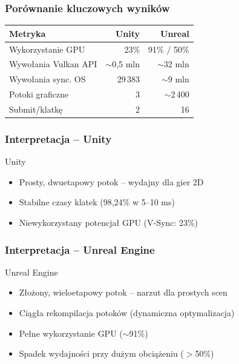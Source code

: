 \documentclass{beamer}
\begin{document}
\begin{frame}
  \frametitle{Porównanie kluczowych wyników}
  \begin{table}
    \centering
    \small
    \begin{tabular}{lrr}
      \toprule
      \textbf{Metryka} & \textbf{Unity} & \textbf{Unreal} \\
      \midrule
      Wykorzystanie GPU & 23\% & 91\% / 50\% \\
      Wywołania Vulkan API & $\sim$0,5 mln & $\sim$32 mln \\
      Wywołania sync. OS & 29\,383 & $\sim$9 mln \\
      Potoki graficzne & 3 & $\sim$2\,400 \\
      Submit/klatkę & 2 & 16 \\
      \bottomrule
    \end{tabular}
  \end{table}
\end{frame}

\begin{frame}
  \frametitle{Interpretacja -- Unity}
  \begin{block}{Unity}
    \begin{itemize}
      \item Prosty, dwuetapowy potok -- wydajny dla gier 2D
      \item Stabilne czasy klatek (98,24\% w 5--10 ms)
      \item Niewykorzystany potencjał GPU (V-Sync: 23\%)
    \end{itemize}
  \end{block}
\end{frame}

\begin{frame}
  \frametitle{Interpretacja -- Unreal Engine}
  \begin{block}{Unreal Engine}
    \begin{itemize}
      \item Złożony, wieloetapowy potok -- narzut dla prostych scen
      \item Ciągła rekompilacja potoków (dynamiczna optymalizacja)
      \item Pełne wykorzystanie GPU ($\sim$91\%)
      \item Spadek wydajności przy dużym obciążeniu ($>$50\%)
    \end{itemize}
  \end{block}
\end{frame}

\end{document}
